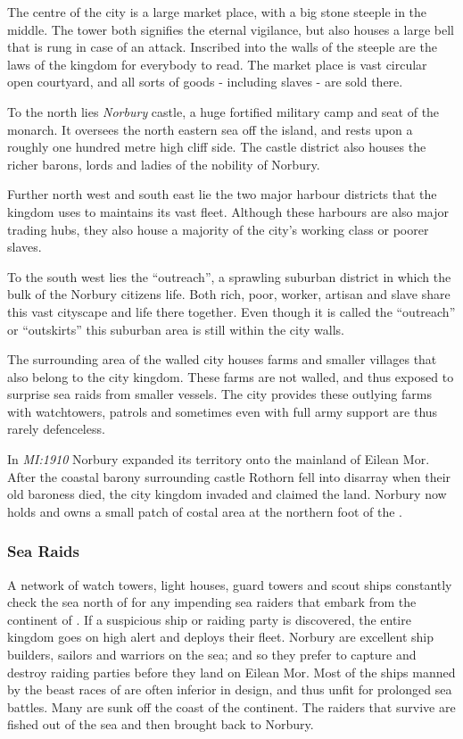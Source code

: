 The centre of the city is a large market place, with a big stone steeple in
the middle. The tower both signifies the eternal vigilance, but also houses a
large bell that is rung in case of an attack. Inscribed into the walls of
the steeple are the laws of the kingdom for everybody to read. The market
place is vast circular open courtyard, and all sorts of goods - including
slaves - are sold there.

To the north lies \emph{Norbury} castle, a huge fortified military camp and
seat of the monarch. It oversees the north eastern sea off the island, and
rests upon a roughly one hundred metre high cliff side. The castle district
also houses the richer barons, lords and ladies of the nobility of Norbury.

Further north west and south east lie the two major harbour districts that
the kingdom uses to maintains its vast fleet. Although these harbours are also
major trading hubs, they also house a majority of the city's working class or
poorer slaves.

To the south west lies the ``outreach'', a sprawling suburban district in which
the bulk of the Norbury citizens life. Both rich, poor, worker, artisan and
slave share this vast cityscape and life there together. Even though it is
called the ``outreach'' or ``outskirts'' this suburban area is still within
the city walls.

The surrounding area of the walled city houses farms and smaller villages that
also belong to the city kingdom. These farms are not walled, and thus
exposed to surprise sea raids from smaller vessels. The city provides these
outlying farms with watchtowers, patrols and sometimes even with full army
support are thus rarely defenceless.

In \emph{MI:1910} Norbury expanded its territory onto the mainland of Eilean
Mor. After the coastal barony surrounding castle Rothorn fell into disarray
when their old baroness died, the city kingdom invaded and claimed the land.
Norbury now holds and owns a small patch of costal area at the northern foot
of the .

\subsubsection{Sea Raids}

A network of watch towers, light houses, guard towers and scout ships
constantly check the sea north of  for any impending
sea raiders that embark from the continent of . If a
suspicious ship or raiding party is discovered, the entire kingdom goes on
high alert and deploys their fleet. Norbury are excellent ship builders,
sailors and warriors on the sea; and so they prefer to capture and destroy
raiding parties before they land on Eilean Mor. Most of the ships manned by
the beast races of  are often inferior in design, and
thus unfit for prolonged sea battles. Many are sunk off the coast of the
continent. The raiders that survive are fished out of the sea and then brought
back to Norbury.

